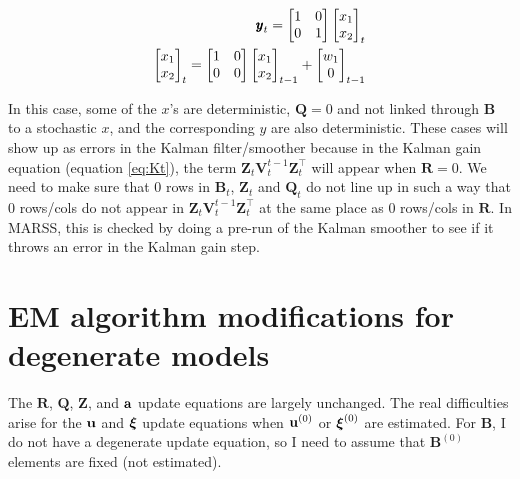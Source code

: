 \documentclass[]{article}
\def\xixi{\mbox{\boldmath $\xi$}}
\def\UPS{\mbox{\boldmath $\Upsilon$}}
\def\XI{\mbox{\boldmath $\Xi$}}
\def\BB{\mbox{$\mathbf B$}}	\def\bb{\mbox{$\mathbf b$}} \def\Bb{\mbox{$\mathbf J$}} \def\Ba{\mbox{$\mathbf L$}} \def\Bm{\UPS}
\def\QQ{\mbox{$\mathbf Q$}}	 \def\qq{\mbox{$\mathbf q$}} \def\Qb{\mbox{$\mathbf G$}}  \def\Qm{\mathbb{Q}}
\def\RR{\mbox{$\mathbf R$}}	 \def\rr{\mbox{$\mathbf r$}} \def\Rb{\mbox{$\mathbf H$}}	\def\Rm{\mathbb{R}}
\def\VV{\mbox{$\mathbf V$}}	\def\vv{\mbox{$\mathbf v$}}
\def\ZZ{\mbox{$\mathbf Z$}}	\def\zz{\mbox{$\mathbf z$}}	\def\Zb{\mbox{$\mathbf M$}} \def\Za{\mbox{$\mathbf N$}} \def\Zm{\XI}
\begin{document}
\begin{equation}
\begin{split}
\yy_t=\begin{bmatrix}
1&0\\
0&1
\end{bmatrix}
\begin{bmatrix}
x_1\\x_2
\end{bmatrix}_t\\
\begin{bmatrix}
x_1\\x_2
\end{bmatrix}_t=
\begin{bmatrix}
1&0\\
0&0
\end{bmatrix}
\begin{bmatrix}
x_1\\x_2
\end{bmatrix}_{t-1}
+
\begin{bmatrix}
w_1\\0
\end{bmatrix}_{t-1}
\end{split}
\end{equation}

In this case, some of the $x$'s are deterministic, $\QQ=0$ and not linked through $\BB$ to a stochastic $x$, and the corresponding $y$ are also deterministic.  These cases will show up as errors in the Kalman filter/smoother because in the Kalman gain equation (equation \ref{eq:Kt}), the term $\ZZ_t\VV_t^{t-1}\ZZ_t^\top$ will appear when $\RR=0$.  We need to make sure that 0 rows in $\BB_t$, $\ZZ_t$ and $\QQ_t$ do not line up in such a way that 0 rows/cols do not appear in $\ZZ_t\VV_t^{t-1}\ZZ_t^\top$ at the same place as 0 rows/cols in $\RR$.  In MARSS, this is checked by doing a pre-run of the Kalman smoother to see if it throws an error in the Kalman gain step. 

\section{EM algorithm modifications for degenerate models}

The $\RR$, $\QQ$, $\ZZ$, and $\aa$ update equations are largely unchanged.  The real difficulties arise for the $\uu$ and $\xixi$ update equations when $\uu^{(0)}$ or $\xixi^{(0)}$ are estimated.  For $\BB$, I do not have a degenerate update equation, so I need to assume that $\BB^{(0)}$ elements are fixed (not estimated).
\end{document}
